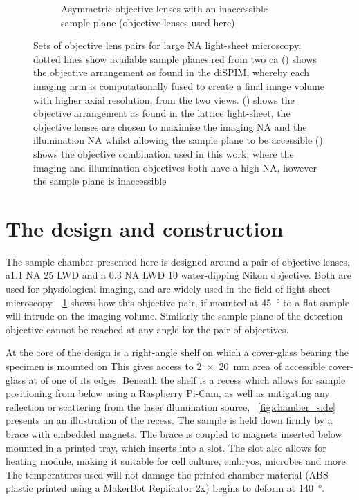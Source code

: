 \begin{figure}
\begin{subfigure}[t]{0.45\linewidth}
        \caption{Asymmetric objective lenses with an inaccessible \gls{sample plane} (objective lenses used here)}\label{fig:assymetric_nikon}
    \end{subfigure}
    \label{}
    \caption{
    Sets of objective lens pairs for large \gls{NA} \gls{light-sheet} microscopy, dotted lines show available sample planes.red from two ca
    () shows the objective arrangement as found in the \gls{diSPIM}, whereby each imaging arm is computationally fused to create a final image volume with higher axial resolution, from the two views.
    () shows the objective arrangement as found in the \gls{lattice light-sheet}, the objective lenses are chosen to maximise the imaging \gls{NA} and the illumination \gls{NA} whilst allowing the sample plane to be accessible
    () shows the objective combination used in this work, where the imaging and illumination objectives both have a high \gls{NA}, however the \gls{sample plane} is inaccessible
    }
    \label{fig:objective_matching}
\end{figure}

\section{The design and construction}

The sample chamber presented here is designed around a pair of objective lenses, a1.1 \gls{NA} \SI{25}{\times} \gls{LWD} and a 0.3 \gls{NA} LWD \SI{10}{\times} water-dipping Nikon objective.
Both are used for physiological imaging, and are widely used in the field of light-sheet microscopy.
\figurename~\ref{fig:assymetric_nikon} shows how this objective pair, if mounted at \SI{45}{\degree} to a flat sample will intrude on the imaging volume.
Similarly the sample plane of the detection objective cannot be reached at any angle for the pair of objectives.

At the core of the design is a right-angle shelf on which a cover-glass bearing the specimen is mounted on
This gives access to \SI{2x20}{\milli\metre} area of accessible cover-glass at of one of its edges.
Beneath the shelf is a recess which allows for sample positioning from below using a Raspberry Pi-Cam, as well as mitigating any reflection or scattering from the laser illumination source, \figurename~\ref{fig:chamber_side} presents an an illustration of the recess.
The sample is held down firmly by a  brace with embedded magnets.
The brace is coupled to magnets inserted below mounted in a printed tray, which inserts into a slot.
The slot also allows for heating module, making it suitable for cell culture, embryos, microbes and more.
The temperatures used will not damage the printed chamber material (\gls{ABS} plastic printed using a MakerBot Replicator 2x) begins to deform at \SI{140}{\degree}.

